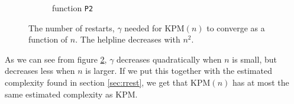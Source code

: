 \begin{figure}[H]
\begin{subfigure}[b]{0.45\textwidth}
                \caption{function \texttt{P2}}
                \label{fig:ant2}
        \end{subfigure}
        \caption{The number of restarts, $\gamma$ needed for KPM$(n)$ to converge as a function of $n$. The helpline decreases with $n^2$.}\label{fig:ant}
\end{figure}
As we can see from figure \ref{fig:ant}, $\gamma$ decreases quadratically when $n$ is small, but decreases less when $n$ is larger. If we put this together with the estimated complexity found in section \ref{sec:rrest}, we get that KPM$(n)$ has at most the same estimated complexity as KPM. 
